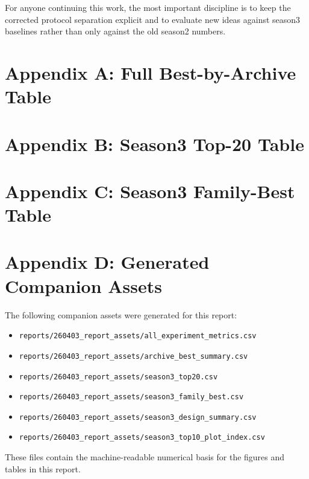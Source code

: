 \documentclass[11pt,a4paper]{article}
\begin{document}
For anyone continuing this work, the most important discipline is to keep the corrected protocol separation explicit and to evaluate new ideas against season3 baselines rather than only against the old season2 numbers.

\appendix

\section{Appendix A: Full Best-by-Archive Table}

\small

\normalsize

\section{Appendix B: Season3 Top-20 Table}

\small

\normalsize

\section{Appendix C: Season3 Family-Best Table}

\small

\normalsize

\section{Appendix D: Generated Companion Assets}

The following companion assets were generated for this report:

\begin{itemize}
\item \texttt{reports/260403\_report\_assets/all\_experiment\_metrics.csv}
\item \texttt{reports/260403\_report\_assets/archive\_best\_summary.csv}
\item \texttt{reports/260403\_report\_assets/season3\_top20.csv}
\item \texttt{reports/260403\_report\_assets/season3\_family\_best.csv}
\item \texttt{reports/260403\_report\_assets/season3\_design\_summary.csv}
\item \texttt{reports/260403\_report\_assets/season3\_top10\_plot\_index.csv}
\end{itemize}

These files contain the machine-readable numerical basis for the figures and tables in this report.
\end{document}
